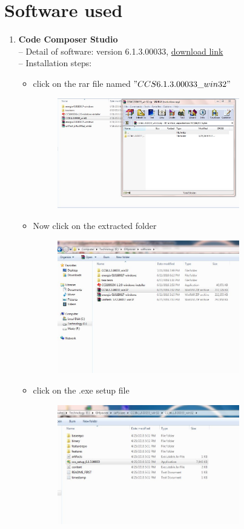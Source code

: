 \documentclass[a4paper,12pt,oneside]{book}
\begin{document}
\newpage
\section{Software used}
\begin{enumerate}
	\item\textbf{ Code Composer Studio} \\
  -- Detail of software: version 6.1.3.00033, \href{http://www.ti.com}{download link}\\
  -- Installation steps:
  \begin{itemize}
  	\item click on the rar file named $"CCS6.1.3.00033\_win32"$
  	  \begin{figure}[h]
  	  	\hspace{2cm}
  	 	\includegraphics[width=300px]{inst1}
  	 \end{figure}
  	 	 \item Now click on the extracted folder
  	  \begin{figure}[h]
  	  		\hspace{2cm}
  	 	\includegraphics[width=300px]{inst2}
  	 \end{figure}
  	 \newpage
  	 \item click on the .exe setup file
  	 \begin{figure}[h]
  	 		\hspace{2cm}
  	  	\includegraphics[width=300px]{inst3}

\end{figure}
\end{itemize}
\end{enumerate}
\end{document}
